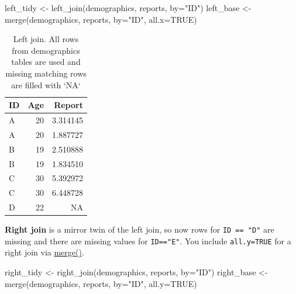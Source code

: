 \documentclass[
]{book}
\newenvironment{Shaded}{\begin{snugshade}}{\end{snugshade}}
\newcommand{\AttributeTok}[1]{\textcolor[rgb]{0.77,0.63,0.00}{#1}}
\newcommand{\ConstantTok}[1]{\textcolor[rgb]{0.00,0.00,0.00}{#1}}
\newcommand{\FunctionTok}[1]{\textcolor[rgb]{0.00,0.00,0.00}{#1}}
\newcommand{\NormalTok}[1]{#1}
\newcommand{\OtherTok}[1]{\textcolor[rgb]{0.56,0.35,0.01}{#1}}
\newcommand{\StringTok}[1]{\textcolor[rgb]{0.31,0.60,0.02}{#1}}
\begin{document}
\begin{Shaded}
\begin{Highlighting}[]
\NormalTok{left\_tidy }\OtherTok{\textless{}{-}} \FunctionTok{left\_join}\NormalTok{(demographics, reports, }\AttributeTok{by=}\StringTok{"ID"}\NormalTok{)}
\NormalTok{left\_base }\OtherTok{\textless{}{-}} \FunctionTok{merge}\NormalTok{(demographics, reports, }\AttributeTok{by=}\StringTok{"ID"}\NormalTok{, }\AttributeTok{all.x=}\ConstantTok{TRUE}\NormalTok{)}
\end{Highlighting}
\end{Shaded}

\begin{table}

\caption{\label{tab:unnamed-chunk-186}Left join. All rows from demographics tables are used and missing matching rows are filled with `NA`}
\centering
\begin{tabular}[t]{l|r|r}
\hline
ID & Age & Report\\
\hline
A & 20 & 3.314145\\
\hline
A & 20 & 1.887727\\
\hline
B & 19 & 2.510888\\
\hline
B & 19 & 1.834510\\
\hline
C & 30 & 5.392972\\
\hline
C & 30 & 6.448728\\
\hline
D & 22 & NA\\
\hline
\end{tabular}
\end{table}

\textbf{Right join} is a mirror twin of the left join, so now rows for \texttt{ID\ ==\ "D"} are missing and there are missing values for \texttt{ID=="E"}. You include \texttt{all.y=TRUE} for a right join via \href{https://stat.ethz.ch/R-manual/R-devel/library/base/html/merge.html}{merge()}.

\begin{Shaded}
\begin{Highlighting}[]
\NormalTok{right\_tidy }\OtherTok{\textless{}{-}} \FunctionTok{right\_join}\NormalTok{(demographics, reports, }\AttributeTok{by=}\StringTok{"ID"}\NormalTok{) }
\NormalTok{right\_base }\OtherTok{\textless{}{-}} \FunctionTok{merge}\NormalTok{(demographics, reports, }\AttributeTok{by=}\StringTok{"ID"}\NormalTok{, }\AttributeTok{all.y=}\ConstantTok{TRUE}\NormalTok{)}
\end{Highlighting}
\end{Shaded}
\end{document}
